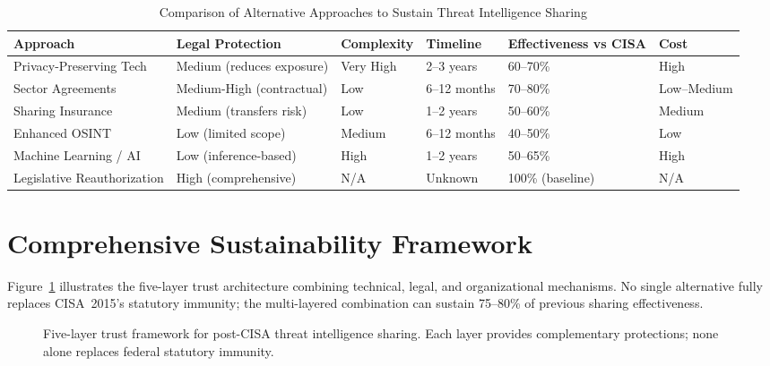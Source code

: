 \documentclass[journal]{IEEEtran}
\begin{document}
\begin{table}[!t]
\caption{Comparison of Alternative Approaches to Sustain Threat Intelligence Sharing}
\centering\small
\begin{tabular}{@{}p{3.0cm}p{2.5cm}p{2.0cm}p{2.5cm}p{2.5cm}p{1.8cm}@{}}
\toprule
\textbf{Approach} & \textbf{Legal Protection} & \textbf{Complexity} & \textbf{Timeline} & \textbf{Effectiveness vs CISA} & \textbf{Cost} \\
\midrule
Privacy-Preserving Tech & Medium (reduces exposure) & Very High & 2--3 years & 60--70\% & High \\
Sector Agreements & Medium-High (contractual) & Low & 6--12 months & 70--80\% & Low--Medium \\
Sharing Insurance & Medium (transfers risk) & Low & 1--2 years & 50--60\% & Medium \\
Enhanced OSINT & Low (limited scope) & Medium & 6--12 months & 40--50\% & Low \\
Machine Learning / AI & Low (inference-based) & High & 1--2 years & 50--65\% & High \\
Legislative Reauthorization & High (comprehensive) & N/A & Unknown & 100\% (baseline) & N/A \\
\bottomrule
\end{tabular}
\label{tab:alternatives_comparison}
\end{table}

\section{Comprehensive Sustainability Framework}

Figure~\ref{fig:trust_framework} illustrates the five-layer trust architecture combining technical, legal, and organizational mechanisms. No single alternative fully replaces CISA~2015's statutory immunity; the multi-layered combination can sustain 75--80\% of previous sharing effectiveness.

\begin{figure}[!t]
\centering
{}
\caption{Five-layer trust framework for post-CISA threat intelligence sharing. Each layer provides complementary protections; none alone replaces federal statutory immunity.}
\label{fig:trust_framework}
\end{figure}
\end{document}
